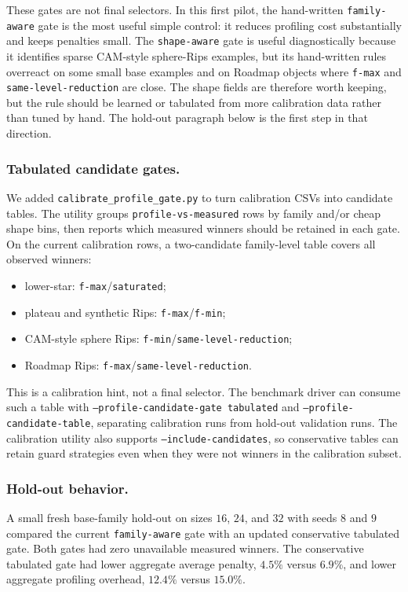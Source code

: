 \documentclass[11pt]{article}
\begin{document}
These gates are not final selectors.  In this first pilot, the hand-written
\texttt{family-aware} gate is the most useful simple control: it reduces profiling cost
substantially and keeps penalties small.  The \texttt{shape-aware} gate is useful
diagnostically because it identifies sparse CAM-style sphere-Rips examples, but its
hand-written rules overreact on some small base examples and on Roadmap objects where
\texttt{f-max} and \texttt{same-level-reduction} are close.  The shape fields are
therefore worth keeping, but the rule should be learned or tabulated from more calibration
data rather than tuned by hand.  The hold-out paragraph below is the first step in that
direction.

\subsubsection*{Tabulated candidate gates.}
We added \texttt{calibrate\_profile\_gate.py} to turn calibration CSVs into candidate
tables.  The utility groups \texttt{profile-vs-measured} rows by family and/or cheap shape
bins, then reports which measured winners should be retained in each gate.  On the current
calibration rows, a two-candidate family-level table covers all observed winners:
\begin{itemize}
  \item lower-star: \texttt{f-max}/\texttt{saturated};
  \item plateau and synthetic Rips: \texttt{f-max}/\texttt{f-min};
  \item CAM-style sphere Rips: \texttt{f-min}/\texttt{same-level-reduction};
  \item Roadmap Rips: \texttt{f-max}/\texttt{same-level-reduction}.
\end{itemize}
This is a calibration hint, not a final selector.  The benchmark driver can consume such a
table with \texttt{--profile-candidate-gate tabulated} and
\texttt{--profile-candidate-table}, separating calibration runs from hold-out validation
runs.  The calibration utility also supports \texttt{--include-candidates}, so conservative
tables can retain guard strategies even when they were not winners in the calibration
subset.

\subsubsection*{Hold-out behavior.}
A small fresh base-family hold-out on sizes $16$, $24$, and $32$ with seeds $8$ and $9$
compared the current \texttt{family-aware} gate with an updated conservative tabulated
gate.  Both gates had zero unavailable measured winners.  The conservative tabulated gate
had lower aggregate average penalty, $4.5\%$ versus $6.9\%$, and lower aggregate profiling
overhead, $12.4\%$ versus $15.0\%$.
\end{document}
